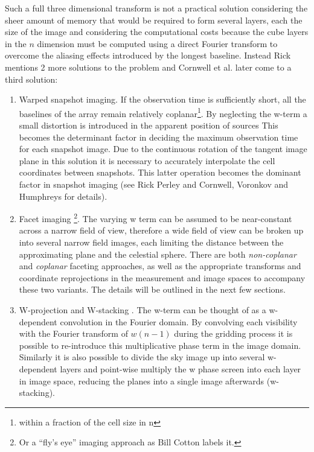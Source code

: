 Such a full three dimensional transform is not a practical solution considering the sheer amount of memory that would be required to form several layers,
each the size of the image and considering the computational costs because the cube layers in the $n$ dimension must be computed using a direct Fourier 
transform to overcome the aliasing effects introduced by the longest baseline. Instead Rick \cite[Lecture 19]{taylor1999synthesis} mentions 2 more 
solutions to the problem and Cornwell et al. \cite{cornwell2008noncoplanar} later come to a third solution:
\begin{enumerate}
 \item Warped snapshot imaging. If the observation time is sufficiently short, all the baselines of the array remain relatively coplanar\footnote{within a 
 fraction of the cell size in n}. By neglecting the w-term a small distortion is introduced in the apparent position of sources This becomes the determinant
 factor in deciding the maximum observation time for each snapshot image. Due to the continuous rotation of the tangent image plane in this solution it is necessary
 to accurately interpolate the cell coordinates between snapshots. This latter operation becomes the dominant factor in snapshot imaging (see Rick Perley \cite[Lecture 19]{taylor1999synthesis}
 and Cornwell, Voronkov and Humphreys \cite{cornwell2012wide} for details).
 \item Facet imaging \footnote{Or a ``fly's eye'' imaging approach as Bill Cotton labels it.}. The varying w term can be assumed to be near-constant across a narrow field of view, therefore a 
 wide field of view can be broken up into several narrow field images, each limiting the distance between the approximating plane and the celestial sphere. There are both \emph{non-coplanar} and \emph{coplanar}
 faceting approaches, as well as the appropriate transforms and coordinate reprojections in the measurement and image spaces to accompany these two variants. The details will be 
 outlined in the next few sections.
 \item W-projection \cite{cornwell2008noncoplanar} and W-stacking \cite{offringa2014wsclean}. The w-term can be thought of as a w-dependent convolution
 in the Fourier domain. By convolving each visibility with the Fourier transform of $w(n-1)$ during the gridding process it is possible to re-introduce 
 this multiplicative phase term in the image domain. Similarly it is also possible to divide the sky image up into several w-dependent layers and point-wise
 multiply the w phase screen into each layer in image space, reducing the planes into a single image afterwards (w-stacking).
\end{enumerate}

